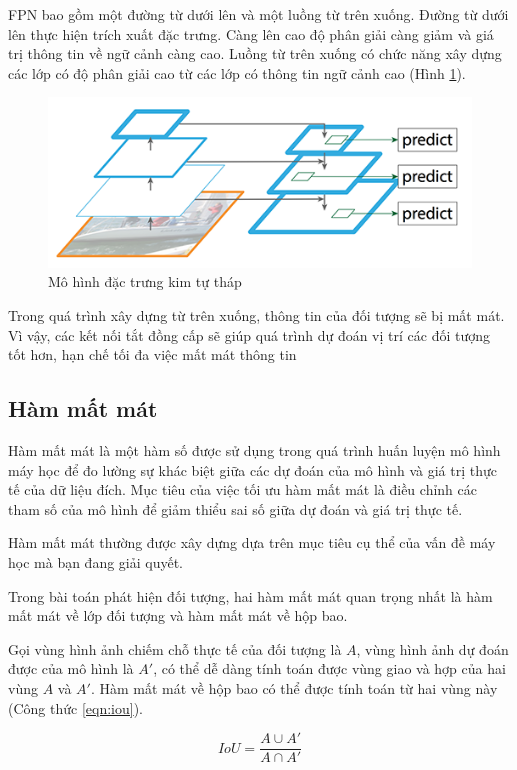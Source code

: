 FPN bao gồm một đường từ dưới lên và một luồng từ trên xuống. Đường từ dưới lên thực hiện trích xuất đặc trưng. Càng lên cao độ phân giải càng giảm và giá trị thông tin về ngữ cảnh càng cao. Luồng từ trên xuống có chức năng xây dựng các lớp có độ phân giải cao từ các lớp có thông tin ngữ cảnh cao (Hình \ref{fig:fpn}).

\begin{figure}[h]
	\centering
	\includegraphics[width=0.8\linewidth]{images/fpn}
	\caption{Mô hình đặc trưng kim tự tháp}
	\label{fig:fpn}
\end{figure}

Trong quá trình xây dựng từ trên xuống, thông tin của đối tượng sẽ bị mất mát. Vì vậy, các kết nối tắt đồng cấp sẽ giúp quá trình dự đoán vị trí các đối tượng tốt hơn, hạn chế tối đa việc mất mát thông tin

\subsection{Hàm mất mát}

Hàm mất mát là một hàm số được sử dụng trong quá trình huấn luyện mô hình máy học để đo lường sự khác biệt giữa các dự đoán của mô hình và giá trị thực tế của dữ liệu đích. Mục tiêu của việc tối ưu hàm mất mát là điều chỉnh các tham số của mô hình để giảm thiểu sai số giữa dự đoán và giá trị thực tế.

Hàm mất mát thường được xây dựng dựa trên mục tiêu cụ thể của vấn đề máy học mà bạn đang giải quyết.

Trong bài toán phát hiện đối tượng, hai hàm mất mát quan trọng nhất là hàm mất mát về lớp đối tượng và hàm mất mát về hộp bao.

Gọi vùng hình ảnh chiếm chỗ thực tế của đối tượng là $A$, vùng hình ảnh dự đoán được của mô hình là $A'$, có thể dễ dàng tính toán được vùng giao và hợp của hai vùng $A$ và $A'$. Hàm mất mát về hộp bao có thể được tính toán từ hai vùng này (Công thức \ref{eqn:iou}).

\begin{equation} 
	\label{eqn:iou}
	IoU=\frac{A\cup A'}{A\cap A'}
\end{equation}

